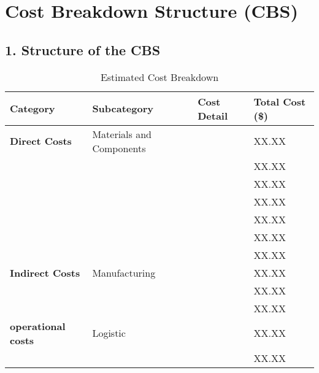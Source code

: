 \documentclass[a4paper,landscape]{article} %
\begin{document}
\section*{Cost Breakdown Structure (CBS)}

\subsection*{1. Structure of the CBS}

\begin{table}[h]
    \centering
    \renewcommand{\arraystretch}{1.2}
    \begin{tabular}{llll}
        \toprule
        \textbf{Category} & \textbf{Subcategory} & \textbf{Cost Detail} & \textbf{Total Cost (\$)} \\
        \midrule
        \textbf{Direct Costs} & Materials and Components &   & XX.XX \\
                              &                          &   & XX.XX \\
                              &                          &   & XX.XX \\
                              &                          &   & XX.XX \\
                              &                          &   & XX.XX \\
                              &                          &   & XX.XX \\
                              &                          &   & XX.XX \\
        \midrule
        \textbf{Indirect Costs} & Manufacturing &     & XX.XX \\
                              &               &       & XX.XX \\
                              &               &       & XX.XX \\
        \midrule
        \textbf{operational costs} & Logistic &  & XX.XX \\
                              &                      &  & XX.XX \\
        \bottomrule
    \end{tabular}
    \caption{Estimated Cost Breakdown}
    \label{tab:direct_costs}
\end{table}
\end{document}
